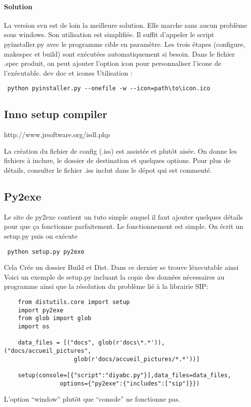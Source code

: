 \documentclass[12pt,a4paper]{article}
\begin{document}
        \paragraph{Solution}
        La version svn est de loin la meilleure solution. Elle marche sans aucun problème sous windows. Son utilisation est simplifi\'ee.
        Il suffit d'appeler le script pyinstaller.py avec le programme cible en paramètre. Les trois \'etapes (configure, makespec et build)
        sont ex\'ecut\'ees automatiquement si besoin. Dans le fichier .spec produit, on peut ajouter l'option icon pour personnaliser l'icone 
        de l'ex\'ecutable.
		dev doc et icones
		Utilisation : \begin{verbatim} python pyinstaller.py --onefile -w --icon=path\to\icon.ico \end{verbatim}

        \subsection{Inno setup compiler}
        http://www.jrsoftware.org/isdl.php

        La cr\'eation du fichier de config (.iss) est assist\'ee et plutôt ais\'ee. On donne les fichiers à inclure, le dossier de destination
        et quelques options. Pour plus de d\'etails, consulter le fichier .iss inclut dans le d\'epot qui est comment\'e.
        \subsection{Py2exe}
        Le site de py2exe contient un tuto simple auquel il faut ajouter quelques d\'etails pour que ça fonctionne parfaitement. Le
        fonctionnement est simple. On \'ecrit un setup.py puis on ex\'ecute \begin{verbatim} python setup.py py2exe \end{verbatim} Cela Cr\'ee un dossier 
        Build et Dist. Dans ce dernier se trouve l\'executable ainsi
        Voici un exemple de setup.py incluant la copie des donn\'ees n\'ecessaires au programme ainsi que la r\'esolution du problème
        li\'e à la librairie SIP:
        \begin{verbatim}
    from distutils.core import setup
    import py2exe
    from glob import glob
    import os

    data_files = [("docs", glob(r'docs\*.*')),("docs/accueil_pictures",
                    glob(r'docs/accueil_pictures/*.*'))]

    setup(console=[{"script":"diyabc.py"}],data_files=data_files, 
                options={"py2exe":{"includes":["sip"]}})
        \end{verbatim}
        L'option ``window'' plutôt que ``console'' ne fonctionne pas.
\end{document}

